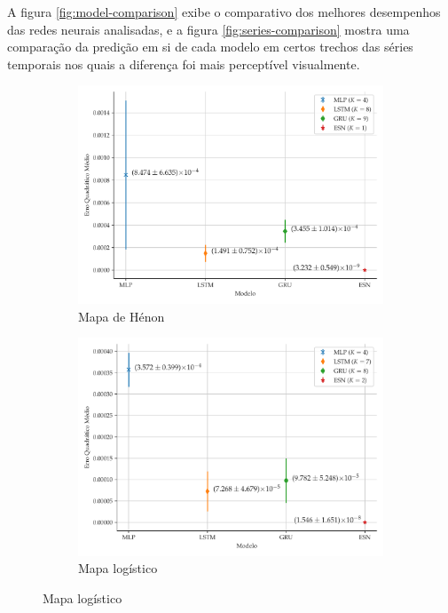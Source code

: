 \documentclass[a4paper, 12pt]{article}
\begin{document}
A figura \ref{fig:model-comparison} exibe o comparativo dos melhores desempenhos das redes neurais analisadas, e a figura \ref{fig:series-comparison} mostra uma comparação da predição em si de cada modelo em certos trechos das séries temporais nos quais a diferença foi mais perceptível visualmente.
\begin{figure}[H]
     \begin{subfigure}[t]{0.45\textwidth}
         \includegraphics[scale=0.385]{comparacao-k-henon.pdf}
         \caption{Mapa de Hénon}
     \end{subfigure}
     \centering
     \begin{subfigure}[t]{0.45\textwidth} 
         \includegraphics[scale=0.385]{comparacao-k-logistic.pdf}
         \caption{Mapa logístico}
     \end{subfigure}

\end{figure}
\end{document}

